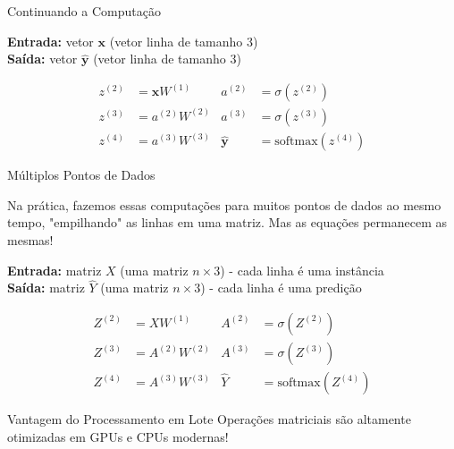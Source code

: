 \documentclass[xcolor=dvipsnames,t,aspectratio=169]{beamer}
\begin{document}
\begin{frame}[c]{Continuando a Computação}
    \begin{display}
        \textbf{Entrada:} vetor $\mathbf{x}$ (vetor linha de tamanho 3)\\
        \textbf{Saída:} vetor $\hat{\mathbf{y}}$ (vetor linha de tamanho 3)
    \end{display}

    
    \begin{align}
        z^{(2)} &= \mathbf{x}W^{(1)} & a^{(2)} &= \sigma(z^{(2)}) \\
        z^{(3)} &= a^{(2)}W^{(2)} & a^{(3)} &= \sigma(z^{(3)}) \\
        z^{(4)} &= a^{(3)}W^{(3)} & \hat{\mathbf{y}} &= \text{softmax}(z^{(4)})
    \end{align}
\end{frame}

\begin{frame}[c]{Múltiplos Pontos de Dados}
    \begin{display}
        Na prática, fazemos essas computações para muitos pontos de dados ao mesmo tempo, "empilhando" as linhas em uma matriz. Mas as equações permanecem as mesmas!
    \end{display}
    
    \vspace{0.5cm}
    
    \textbf{Entrada:} matriz $X$ (uma matriz $n \times 3$) - cada linha é uma instância\\
    \textbf{Saída:} matriz $\hat{Y}$ (uma matriz $n \times 3$) - cada linha é uma predição
    
    \vspace{0.5cm}
    
    \begin{align}
        Z^{(2)} &= XW^{(1)} & A^{(2)} &= \sigma(Z^{(2)}) \\
        Z^{(3)} &= A^{(2)}W^{(2)} & A^{(3)} &= \sigma(Z^{(3)}) \\
        Z^{(4)} &= A^{(3)}W^{(3)} & \hat{Y} &= \text{softmax}(Z^{(4)})
    \end{align}
    
    \begin{alertblock}{Vantagem do Processamento em Lote}
        Operações matriciais são altamente otimizadas em GPUs e CPUs modernas!
    \end{alertblock}
\end{frame}
\end{document}
